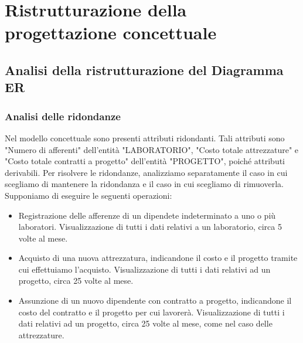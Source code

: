 \chapter{Ristrutturazione della progettazione concettuale}
    \section{Analisi della ristrutturazione del Diagramma ER}
        \subsection{Analisi delle ridondanze}
            Nel modello concettuale sono presenti attributi ridondanti. Tali attributi sono "Numero di afferenti" dell'entità "LABORATORIO", "Costo totale attrezzature" e "Costo totale contratti a progetto" dell'entità "PROGETTO", poiché attributi derivabili. Per risolvere le ridondanze, analizziamo separatamente il caso in cui scegliamo di mantenere la ridondanza e il caso in cui scegliamo di rimuoverla. Supponiamo di eseguire le seguenti operazioni:
            \begin{itemize}
                \item Registrazione delle afferenze di un dipendete indeterminato a uno o più laboratori. Visualizzazione di tutti i dati relativi a un laboratorio, circa 5 volte al mese.
                \item Acquisto di una nuova attrezzatura, indicandone il costo e il progetto tramite cui effettuiamo l'acquisto. Visualizzazione di tutti i dati relativi ad un progetto, circa 25 volte al mese.
                \item Assunzione di un nuovo dipendente con contratto a progetto, indicandone il costo del contratto e il progetto per cui lavorerà. Visualizzazione di tutti i dati relativi ad un progetto, circa 25 volte al mese, come nel caso delle attrezzature.
            \end{itemize}

